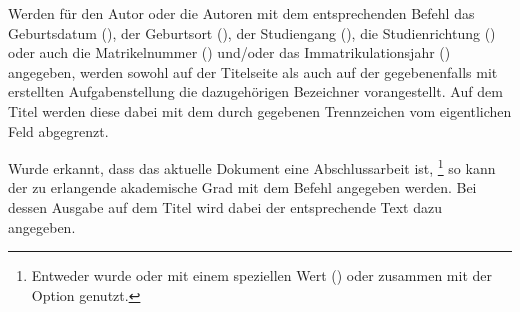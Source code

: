 \begin{Declaration*}{}
\begin{Declaration*}{}
\begin{Declaration*}{}
\begin{Declaration}{}
\begin{Declaration}{}
\begin{Declaration}{}
\begin{Declaration}{}
\begin{Declaration}{}
\begin{Declaration}[v2.02]{}
\printdeclarationlist%
%
%
%
Werden für den Autor oder die Autoren mit dem entsprechenden Befehl das 
Geburtsdatum (), der Geburtsort (), der 
Studiengang (), die Studienrichtung () oder 
auch die Matrikelnummer () und/oder das 
Immatrikulationsjahr () angegeben, werden sowohl auf 
der Titelseite als auch auf der gegebenenfalls mit  
erstellten Aufgabenstellung die dazugehörigen Bezeichner vorangestellt. Auf dem 
Titel werden diese dabei mit dem durch  gegebenen 
Trennzeichen vom eigentlichen Feld abgegrenzt.
\end{Declaration}
\end{Declaration}
\end{Declaration}
\end{Declaration}
\end{Declaration}
\end{Declaration}

\begin{Declaration}[v2.02]{}
\printdeclarationlist%
%
%
%
Wurde erkannt, dass das aktuelle Dokument eine Abschlussarbeit ist,%
\footnote{%
  Entweder wurde  oder  mit einem speziellen Wert 
  () oder zusammen mit der Option 
   genutzt.\label{fn:thesis}%
}
so kann der zu erlangende akademische Grad mit dem Befehl  
angegeben werden. Bei dessen Ausgabe auf dem Titel wird dabei der entsprechende 
Text dazu angegeben.
\end{Declaration}


\end{Declaration*}
\end{Declaration*}
\end{Declaration*}
